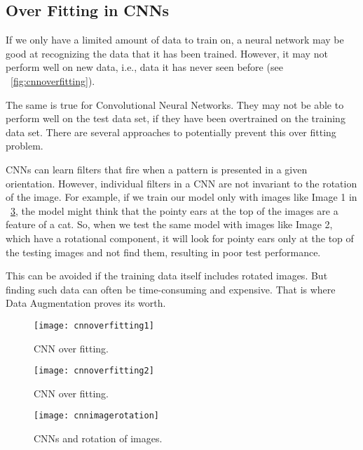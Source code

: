 	\subsection{Over Fitting in CNNs}
	\begin{bulletedlist}
		\item If we only have a limited amount of data to train on, a neural network may be good at recognizing the data that it has been trained. However, it may not perform well on new data, i.e., data it has never seen before (see \figurename~\ref{fig:cnnoverfitting}).
		\item The same is true for Convolutional Neural Networks. They may not be able to perform well on the
test data set, if they have been overtrained on the training data set. There are several
approaches to potentially prevent this over fitting problem.
		\item CNNs can learn filters that fire when a pattern is presented in a given orientation.  However, individual filters in a CNN are not invariant to the rotation of the image.  For example, if we train our model only with images like Image 1 in \figurename~\ref{fig:cnnimagerotation}, the model might think that the pointy ears at the top of the images are a feature of a cat. So, when we test the same model with images like Image 2, which have a rotational component, it will look for pointy ears only at the top of the testing images and not find them, resulting in poor test performance.
		\item This can be avoided if the training data itself includes rotated images.  But finding such data can often be time-consuming and expensive.  That is where Data Augmentation proves its worth.
	\end{bulletedlist}

	\begin{figure}[tbh]
		\centering
		\texttt{[image: cnnoverfitting1]}
		\caption[CNN over fitting]{CNN over fitting.}
		\label{fig:cnnoverfitting1}
	\end{figure}
	\begin{figure}[tbh]
		\centering
		\texttt{[image: cnnoverfitting2]}
		\caption[CNN over fitting]{CNN over fitting.}
		\label{fig:cnnoverfitting2}
	\end{figure}
	\begin{figure}[tbh]
		\centering
		\texttt{[image: cnnimagerotation]}
		\caption[CNNs and rotation of images]{CNNs and rotation of images.}
		\label{fig:cnnimagerotation}
	\end{figure}

